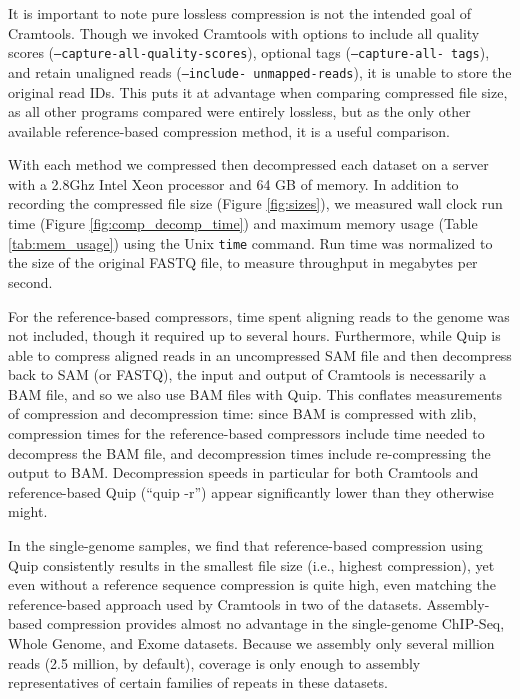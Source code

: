 \documentclass[a4,center,fleqn]{NAR}
\begin{document}

It is important to note pure lossless compression is not the intended goal of
Cramtools. Though we invoked Cramtools with options to include all quality
scores (\texttt{--capture-all-quality-scores}), optional tags (\texttt
{--capture-all- tags}), and retain unaligned reads (\texttt{--include-
unmapped-reads}), it is unable to store the original read IDs. This puts it at
advantage when comparing compressed file size, as all other programs compared
were entirely lossless, but as the only other available reference-based
compression method, it is a useful comparison.


With each method we compressed then decompressed each dataset on a server with
a 2.8Ghz Intel Xeon processor and 64 GB of memory. In addition to recording
the compressed file size (Figure \ref{fig:sizes}), we measured wall clock run
time (Figure \ref{fig:comp_decomp_time}) and maximum memory usage (Table
\ref{tab:mem_usage}) using the Unix \texttt{time} command. Run time was 
normalized to the size of the original FASTQ file, to measure throughput in
megabytes per second.

For the reference-based compressors, time spent aligning reads to the genome
was not included, though it required up to several hours. Furthermore, while
Quip is able to compress aligned reads in an uncompressed SAM file and then
decompress back to SAM (or FASTQ), the input and output of Cramtools is
necessarily a BAM file, and so we also use BAM files with Quip. This conflates
measurements of compression and decompression time: since BAM is compressed
with zlib, compression times for the reference-based compressors include time
needed to decompress the BAM file, and decompression times include
re-compressing the output to BAM. Decompression speeds in particular for both
Cramtools and reference-based Quip (``quip -r'') appear significantly lower
than they otherwise might.

In the single-genome samples, we find that reference-based compression using
Quip consistently results in the smallest file size (i.e., highest
compression), yet even without a reference sequence compression is quite high,
even matching the reference-based approach used by Cramtools in two of the
datasets. Assembly-based compression provides almost no advantage in the
single-genome ChIP-Seq, Whole Genome, and Exome datasets. Because we assembly
only several million reads (2.5 million, by default), coverage is only enough
to assembly representatives of certain families of repeats in these datasets.
\end{document}
